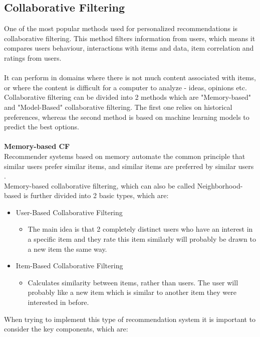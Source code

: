 \documentclass[10pt,oneside,english,a4paper]{article}
\begin{document}
\subsection{Collaborative Filtering}
One of the most popular methods used for personalized recommendations is collaborative filtering. This method filters information from users, which means it compares users behaviour, interactions with items and data, item correlation and ratings from users. \\\\
It can perform in domains where there is not much content associated with items, or where the content is difficult for a computer to analyze - ideas, opinions etc.\cite{melville:aaai02}\\
Collaborative filtering can be divided into 2 methods which are "Memory-based" and "Model-Based" collaborative filtering. The first one relies on historical preferences, whereas the second method is based on machine learning models to predict the best options.\\\\
%
\textbf{Memory-based CF}\\
Recommender systems based on memory automate the common principle that similar users prefer similar items, and similar items are preferred by similar users \cite{Ning201537}. \\
Memory-based collaborative filtering, which can also be called Neighborhood-based is further divided into 2 basic types, which are:
\begin{itemize}
\item User-Based Collaborative Filtering
	\begin{itemize}
	\item The main idea is that 2 completely distinct users who have an interest in a specific item and they rate this item similarly will probably be drawn to a new item the same way.
	\end{itemize}
\item Item-Based Collaborative Filtering
	\begin{itemize}
	\item Calculates similarity between items, rather than users. The user will probably like a new item which is similar to another item they were interested in before.
	\end{itemize}
\end{itemize}
%
When trying to implement this type of recommendation system it is important to consider the key components, which are: 
\end{document}
